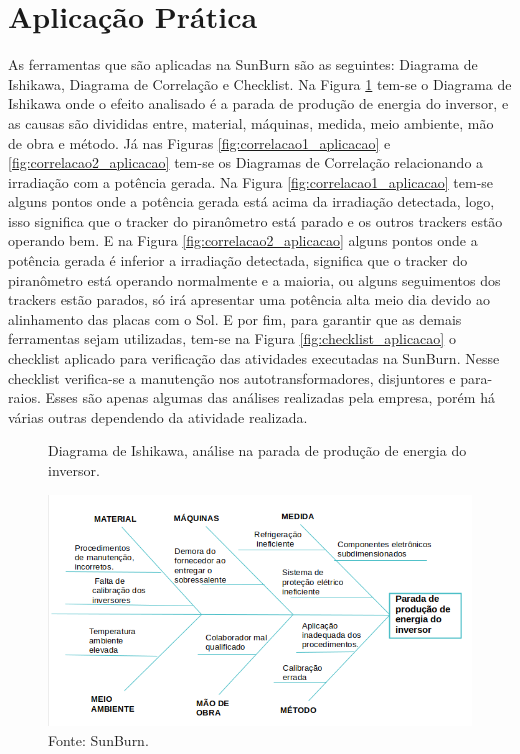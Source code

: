 \section{Aplicação Prática}
\label{sec:controle_estatistico_aplicacao}
As ferramentas que são aplicadas na SunBurn são as seguintes: Diagrama de Ishikawa, Diagrama de Correlação e Checklist.
Na Figura \ref{fig:ishikawa_aplicacao} tem-se o Diagrama de Ishikawa onde o efeito analisado é a parada de produção de energia do inversor, e as causas são divididas entre, material, máquinas, medida, meio ambiente, mão de obra e método.
Já nas Figuras \ref{fig:correlacao1_aplicacao} e \ref{fig:correlacao2_aplicacao} tem-se os Diagramas de Correlação relacionando a irradiação com a potência gerada. Na Figura \ref{fig:correlacao1_aplicacao} tem-se alguns pontos onde a potência gerada está acima da irradiação detectada, logo, isso significa que o tracker do piranômetro está parado e os outros trackers estão operando bem.
E na Figura \ref{fig:correlacao2_aplicacao} alguns pontos onde a potência gerada é inferior a irradiação detectada, significa que o tracker do piranômetro está operando normalmente e a maioria, ou alguns seguimentos dos trackers estão parados, só irá apresentar uma potência alta meio dia devido ao alinhamento das placas com o Sol.  
E por fim, para garantir que as demais ferramentas sejam utilizadas, tem-se na Figura \ref{fig:checklist_aplicacao} o checklist aplicado para verificação das atividades executadas na SunBurn. Nesse checklist verifica-se a manutenção nos autotransformadores, disjuntores e para-raios. Esses são apenas algumas das análises realizadas pela empresa, porém há várias outras dependendo da atividade realizada.

\begin{figure}[H]
    \caption{Diagrama de Ishikawa, análise na parada de produção de energia do inversor.} %
    \includegraphics[width=1\textwidth]{images/ishikawa_aplicacao.png}
    \caption*{Fonte: SunBurn.}
    \label{fig:ishikawa_aplicacao}
  \end{figure}

